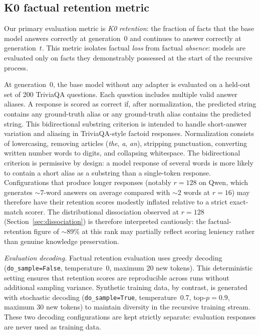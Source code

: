 \documentclass[a4paper,fleqn]{cas-dc}
\newif\ifshowchanges
\newcommand{\rev}[1]{\ifshowchanges{\color{blue}#1}\else{#1}\fi}
\begin{document}
\subsection{K0 factual retention metric}\label{sec:k0}

Our primary evaluation metric is \textit{K0 retention}: the fraction of
facts that the base model answers correctly at generation~0 and continues to
answer correctly at generation~$t$. This metric isolates factual
\textit{loss} from factual \textit{absence}: models are evaluated only on
facts they demonstrably possessed at the start of the recursive process.

At generation~0, the base model without any adapter is evaluated on a held-out
set of 200 TriviaQA questions. Each question includes multiple valid answer
aliases. A response is scored as correct if, after normalization, the predicted
string contains any ground-truth alias or any ground-truth alias contains the
predicted string. This bidirectional substring criterion is intended to handle
short-answer variation and aliasing in TriviaQA-style factoid responses.
Normalization consists of lowercasing, removing articles
(\textit{the}, \textit{a}, \textit{an}), stripping punctuation, converting
written number words to digits, and collapsing whitespace.
The bidirectional criterion is permissive by design: a model response of several
words is more likely to contain a short alias as a substring than a
single-token response. Configurations that produce longer responses
(notably $r=128$ on Qwen, which generates $\sim$7-word answers on average
compared with $\sim$2 words at $r=16$) may therefore have their retention
scores modestly inflated relative to a strict exact-match scorer. The
distributional dissociation observed at $r=128$ (Section~\ref{sec:dissociation})
is therefore interpreted cautiously: the factual-retention figure of $\sim$89\%
at this rank may partially reflect scoring leniency rather than genuine
knowledge preservation. %

\textit{Evaluation decoding.} Factual retention evaluation uses greedy
decoding (\rev{\texttt{do\_sample=False},} temperature~0, maximum 20 new tokens). This deterministic setting
ensures that retention scores are reproducible across runs without additional
sampling variance. Synthetic training data, by contrast, is generated with
stochastic decoding (\rev{\texttt{do\_sample=True},} temperature~0.7, top-$p=0.9$, maximum 30 new tokens) to
maintain diversity in the recursive training stream. These two decoding
configurations are kept strictly separate: evaluation responses are never used
as training data.
\end{document}
